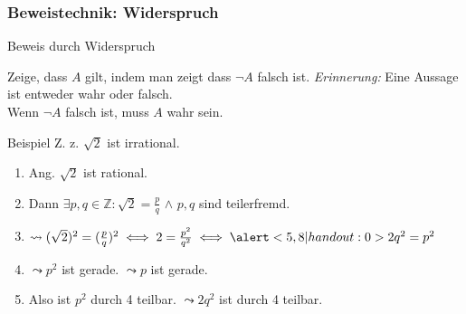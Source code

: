 \subsubsection{Beweistechnik: Widerspruch}
\begin{frame}[fragile]{Beweis durch Widerspruch}
\small{
    \begin{alertblock}{Zeige, dass $A$ gilt, indem man zeigt dass $\neg A$ falsch ist.}
    \emph{Erinnerung:} Eine Aussage ist entweder wahr oder falsch.\\
    Wenn $\neg A$ falsch ist, muss $A$ wahr sein.
    \end{alertblock}
    \begin{exampleblock}{Beispiel}
        Z. z. $\sqrt{2}$ ist irrational.
        \begin{enumerate}
            \item<1-|handout:1> \alert<1|handout:0>{Ang. $\sqrt{2}$ ist rational.}
            \item<2-|handout:1> \alert<2|handout:0>{Dann $\exists p, q \in \mathbb{Z} : \sqrt{2} = \frac{p}{q}$} $\wedge$ \alert<3,11|handout:0>{$p, q$ sind teilerfremd.}
            \item<4-|handout:1> $\leadsto(\sqrt{2})^2 = (\frac{p}{q})^2 \iff 2 = \frac{p^2}{q^2} \iff \alert<5,8|handout:0>{2q^2=p^2}$
            \item<5-|handout:1> \alert<5|handout:0>{$\leadsto p^2$ ist gerade.} \alert<6,10|handout:0>{$\leadsto p$ ist gerade.}
            \item<7-|handout:1> \alert<7|handout:0>{Also ist $p^2$ durch 4 teilbar.} \alert<8|handout:0>{$\leadsto 2q^2$ ist durch 4 teilbar.}

\end{enumerate}
\end{exampleblock}}
\end{frame}
